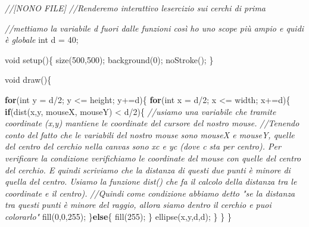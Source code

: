 \documentclass[
]{article}
\newenvironment{Shaded}{}{}
\newcommand{\CommentTok}[1]{\textcolor[rgb]{0.38,0.63,0.69}{\textit{#1}}}
\newcommand{\ControlFlowTok}[1]{\textcolor[rgb]{0.00,0.44,0.13}{\textbf{#1}}}
\newcommand{\DataTypeTok}[1]{\textcolor[rgb]{0.56,0.13,0.00}{#1}}
\newcommand{\DecValTok}[1]{\textcolor[rgb]{0.25,0.63,0.44}{#1}}
\newcommand{\FunctionTok}[1]{\textcolor[rgb]{0.02,0.16,0.49}{#1}}
\newcommand{\NormalTok}[1]{#1}
\newcommand{\OperatorTok}[1]{\textcolor[rgb]{0.40,0.40,0.40}{#1}}
\begin{document}
\begin{Shaded}
\begin{Highlighting}[]
\CommentTok{//[NONO FILE]}
\CommentTok{//Renderemo interattivo l\textquotesingle{}esercizio sui cerchi di prima}

\CommentTok{//mettiamo la variabile \textquotesingle{}d\textquotesingle{} fuori dalle funzioni così ho uno scope più ampio e quidi è globale}
  \DataTypeTok{int}\NormalTok{ d }\OperatorTok{=} \DecValTok{40}\OperatorTok{;}

\DataTypeTok{void} \FunctionTok{setup}\OperatorTok{()\{}
  \FunctionTok{size}\OperatorTok{(}\DecValTok{500}\OperatorTok{,}\DecValTok{500}\OperatorTok{);}
  \FunctionTok{background}\OperatorTok{(}\DecValTok{0}\OperatorTok{);}
  \FunctionTok{noStroke}\OperatorTok{();}
\OperatorTok{\}}

\DataTypeTok{void} \FunctionTok{draw}\OperatorTok{()\{}

  \ControlFlowTok{for}\OperatorTok{(}\DataTypeTok{int}\NormalTok{ y }\OperatorTok{=}\NormalTok{ d}\OperatorTok{/}\DecValTok{2}\OperatorTok{;}\NormalTok{ y }\OperatorTok{\textless{}=}\NormalTok{ height}\OperatorTok{;}\NormalTok{ y}\OperatorTok{+=}\NormalTok{d}\OperatorTok{)\{}
    \ControlFlowTok{for}\OperatorTok{(}\DataTypeTok{int}\NormalTok{ x }\OperatorTok{=}\NormalTok{ d}\OperatorTok{/}\DecValTok{2}\OperatorTok{;}\NormalTok{ x }\OperatorTok{\textless{}=}\NormalTok{ width}\OperatorTok{;}\NormalTok{ x}\OperatorTok{+=}\NormalTok{d}\OperatorTok{)\{}
      \ControlFlowTok{if}\OperatorTok{(}\FunctionTok{dist}\OperatorTok{(}\NormalTok{x}\OperatorTok{,}\NormalTok{y}\OperatorTok{,}\NormalTok{ mouseX}\OperatorTok{,}\NormalTok{ mouseY}\OperatorTok{)} \OperatorTok{\textless{}}\NormalTok{ d}\OperatorTok{/}\DecValTok{2}\OperatorTok{)\{} \CommentTok{//usiamo una variabile che tramite coordinate (x,y) mantiene le coordinate del cursore del nostro mouse.}
          \CommentTok{//Tenendo conto del fatto che le variabili del nostro mouse sono mouseX e mouseY, quelle del centro del cerchio nella canvas sono xc e yc (dove c sta per centro). Per verificare la condizione verifichiamo le coordinate del mouse con quelle del centro del cerchio. E quindi scriviamo che la distanza di questi due punti è minore di quella del centro. Usiamo la funzione \textquotesingle{}dist()\textquotesingle{} che fa il calcolo della distanza tra le coordinate e il centro).}
          \CommentTok{//Quindi come condizione abbiamo detto "se la distanza tra questi punti è minore del raggio, allora siamo dentro il cerchio e puoi colorarlo"}
        \FunctionTok{fill}\OperatorTok{(}\DecValTok{0}\OperatorTok{,}\DecValTok{0}\OperatorTok{,}\DecValTok{255}\OperatorTok{);}      
      \OperatorTok{\}}\ControlFlowTok{else}\OperatorTok{\{}
        \FunctionTok{fill}\OperatorTok{(}\DecValTok{255}\OperatorTok{);}
      \OperatorTok{\}}
      \FunctionTok{ellipse}\OperatorTok{(}\NormalTok{x}\OperatorTok{,}\NormalTok{y}\OperatorTok{,}\NormalTok{d}\OperatorTok{,}\NormalTok{d}\OperatorTok{);}
    \OperatorTok{\}}
  \OperatorTok{\}}
\OperatorTok{\}}
\end{Highlighting}
\end{Shaded}
\end{document}
